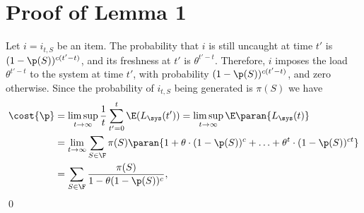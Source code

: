 \section{Proof of Lemma 1}\label{app:proof}

 Let $i=i_{t, S}$ be an item. The probability that $i$ is still uncaught at time $t'$ is $(1-\p(S))^{c(t'-t)}$, and its freshness at $t'$ is $\theta^{t' - t}$. Therefore, $i$ imposes the load $\theta^{t'-t}$ to the system at time $t'$, with probability $(1-\p(S))^{c(t'-t)}$, and zero otherwise. Since the probability of $i_{t,S}$ being generated is $\pi(S)$ we have
\begin{align*}
 \cost{\p} &= \limsup_{t\rightarrow\infty}\frac{1}{t}\sum_{t'=0}^t\E(L_{\sys}(t')) = \limsup_{t\rightarrow \infty} \E\paran{L_{\sys}(t)} \\
 &=\lim_{t\rightarrow \infty} \sum_{S\in \F} \pi(S) \paran{1 + \theta\cdot(1-\p(S))^c + \ldots + \theta^t\cdot(1-\p(S))^{ct}} \\ 
 &=
 \sum_{S\in \F} \frac{\pi(S)}{1-\theta(1-\p(S))^c},
\end{align*}
\qed


